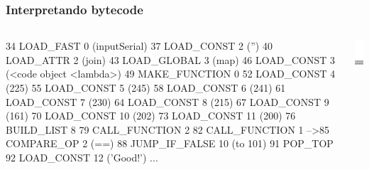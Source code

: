 \documentclass[9pt, notes=hide]{beamer}
\begin{document}
\begin{frame}[fragile]
    \frametitle{Interpretando bytecode}
        \begin{columns}[T]
            \begin{column}{.8\textwidth}
\begin{python}
   34  LOAD_FAST          0 (inputSerial)
   37  LOAD_CONST         2 ('')
   40  LOAD_ATTR          2 (join)
   43  LOAD_GLOBAL        3 (map)
   46  LOAD_CONST         3 (<code object <lambda>)
   49  MAKE_FUNCTION      0
   52  LOAD_CONST         4 (225)
   55  LOAD_CONST         5 (245)
   58  LOAD_CONST         6 (241)
   61  LOAD_CONST         7 (230)
   64  LOAD_CONST         8 (215)
   67  LOAD_CONST         9 (161)
   70  LOAD_CONST        10 (202)
   73  LOAD_CONST        11 (200)
   76  BUILD_LIST         8
   79  CALL_FUNCTION      2
   82  CALL_FUNCTION      1
-->85  COMPARE_OP         2 (==)
   88  JUMP_IF_FALSE     10 (to 101)
   91  POP_TOP
   92  LOAD_CONST        12 ('Good!')
   ...
\end{python}

            \end{column}
            \begin{column}{.3\textwidth}
                \includegraphics[width=2.5cm]{images/stack-6.png}
            \end{column}
        \end{columns}

\end{frame}
\end{document}
